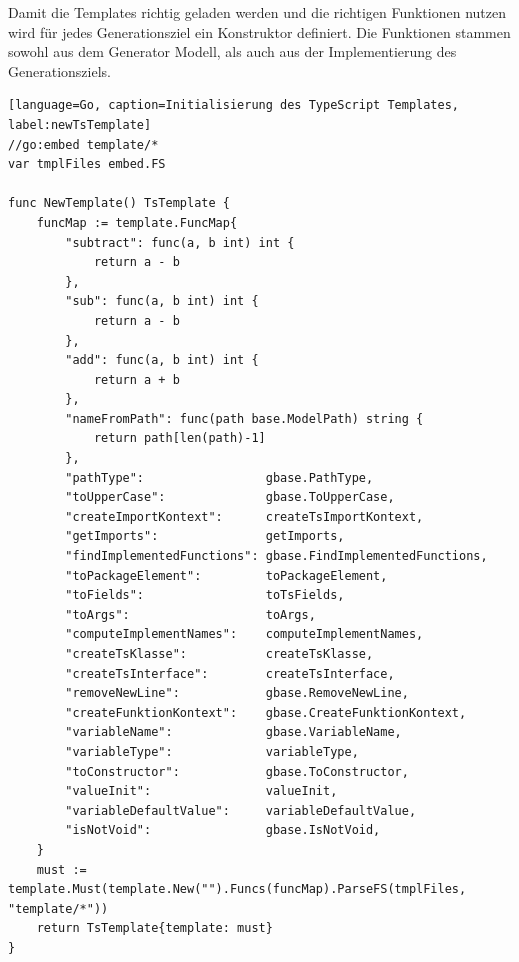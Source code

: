 \documentclass[./einleitung.tex]{subfiles}
\begin{document}
    Damit die Templates richtig geladen werden und die richtigen Funktionen nutzen wird für jedes Generationsziel ein Konstruktor definiert.
    Die Funktionen stammen sowohl aus dem Generator Modell, als auch aus der Implementierung des Generationsziels.
    \begin{lstlisting}[language=Go, caption=Initialisierung des TypeScript Templates, label:newTsTemplate]
//go:embed template/*
var tmplFiles embed.FS

func NewTemplate() TsTemplate {
	funcMap := template.FuncMap{
		"subtract": func(a, b int) int {
			return a - b
		},
		"sub": func(a, b int) int {
			return a - b
		},
		"add": func(a, b int) int {
			return a + b
		},
		"nameFromPath": func(path base.ModelPath) string {
			return path[len(path)-1]
		},
		"pathType":                 gbase.PathType,
		"toUpperCase":              gbase.ToUpperCase,
		"createImportKontext":      createTsImportKontext,
		"getImports":               getImports,
		"findImplementedFunctions": gbase.FindImplementedFunctions,
		"toPackageElement":         toPackageElement,
		"toFields":                 toTsFields,
		"toArgs":                   toArgs,
		"computeImplementNames":    computeImplementNames,
		"createTsKlasse":           createTsKlasse,
		"createTsInterface":        createTsInterface,
		"removeNewLine":            gbase.RemoveNewLine,
		"createFunktionKontext":    gbase.CreateFunktionKontext,
		"variableName":             gbase.VariableName,
		"variableType":             variableType,
		"toConstructor":            gbase.ToConstructor,
		"valueInit":                valueInit,
		"variableDefaultValue":     variableDefaultValue,
		"isNotVoid":                gbase.IsNotVoid,
	}
	must := template.Must(template.New("").Funcs(funcMap).ParseFS(tmplFiles, "template/*"))
	return TsTemplate{template: must}
}
    \end{lstlisting}
\end{document}
